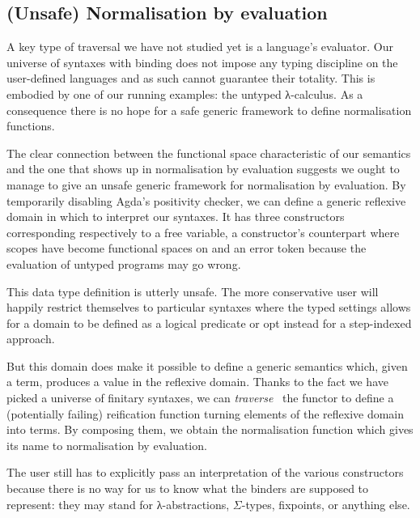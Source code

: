 \subsection{(Unsafe) Normalisation by evaluation}\label{section:nbyeval}

A key type of traversal we have not studied yet is a language's
evaluator. Our universe of syntaxes with binding does not impose
any typing discipline on the user-defined languages and as such
cannot guarantee their totality. This is embodied by one of our running
examples: the untyped λ-calculus. As a consequence there
is no hope for a safe generic framework to define normalisation
functions.

The clear connection between the  functional space
characteristic of our semantics and the one that shows up in
normalisation by evaluation suggests we ought to manage to
give an unsafe generic framework for normalisation by evaluation.
By temporarily disabling Agda's positivity checker,
we can define a generic reflexive domain  in which to
interpret our syntaxes. It has three constructors corresponding
respectively to a free variable, a constructor's counterpart where
scopes have become  functional spaces on  and
an error token because the evaluation of untyped programs may go wrong.

\begin{agdasnippet}
\end{agdasnippet}

This data type definition is utterly unsafe. The more conservative
user will happily restrict themselves to particular syntaxes where
the typed settings allows for a domain to be defined as a logical
predicate or opt instead for a step-indexed approach.

But this domain does make it possible to define a generic 
semantics which, given a term, produces a value in the reflexive
domain. Thanks to the fact we have picked a universe of finitary syntaxes, we
can \emph{traverse}~\cite{mcbride_paterson_2008,DBLP:journals/jfp/GibbonsO09}
the functor to define
a (potentially failing) reification function turning elements of the
reflexive domain into terms. By composing them, we obtain the
normalisation function which gives its name to normalisation by
evaluation.

The user still has to explicitly pass an interpretation of
the various constructors because there is no way for us to
know what the binders are supposed to represent: they may
stand for λ-abstractions, $\Sigma$-types, fixpoints, or
anything else.

